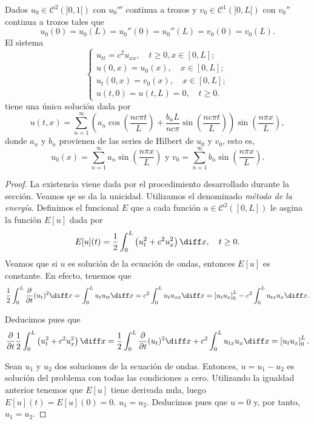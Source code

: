 \documentclass{article}
\begin{document}
\begin{theorem}
  \label{thm:ondas:2}
  Dados $u_0 \in \mathcal{C}^2(]0,1[)$ con $u_0'''$ continua a trozos y
  $v_0 \in \mathcal{C}^1(]0,L[)$ con $v_0''$ continua a trozos tales que
  \[ u_0(0) = u_0(L) = u_0''(0) = u_0''(L) = v_0(0) = v_0(L). \] El sistema
  \[
    \begin{cases}
      u_{tt} = c^2 u_{xx}, \quad t \ge 0, x \in [0,L]; \\
      u(0,x) = u_0(x), \quad x \in [0,L]; \\
      u_t(0,x) = v_0(x), \quad x \in [0,L]; \\
      u(t,0) = u(t, L) = 0, \quad t \ge 0.
    \end{cases}
  \]
  tiene una única solución dada por
  \[ u(t,x) = \sum\limits_{n = 1}^{\infty} \left( a_n \cos(\frac{n c \pi t}{L}) + \frac{b_nL}{n c
        \pi} \sin(\frac{n c \pi t}{L}) \right) \sin(\frac{n \pi x}{L}),\] donde $a_n$ y $b_n$
  provienen de las series de Hilbert de $u_0$ y $v_0$, esto es,
  \[u_0(x) = \sum\limits_{n = 1}^{\infty} a_n \sin(\frac{n \pi x}{L}) \text{ y } v_0 =
    \sum\limits_{n = 1}^{\infty} b_n \sin(\frac{n \pi x}{L}).\]
\end{theorem}
\begin{proof}
  La existencia viene dada por el procedimiento desarrollado durante la sección. Veamos qe se da la
  unicidad. Utilizamos el denominado \emph{método de la energía}. Definimos el funcional $E$ que a
  cada función $u \in \mathcal{C}^2([0,L])$ le asgina la función $E[u]$ dada por
  \[ E[u](t) = \frac{1}{2} \int_0^L \left( u_t^2 + c^2 u_x^2 \right) \diff x, \quad t \ge 0. \]
  Veamos que si $u$ es solución de la ecuación de ondas, entonces $E[u]$ es constante. En efecto,
  tenemos que
  \[ \frac{1}{2}\int_0^L \frac{\partial}{\partial t}(u_t)^2 \diff x = \int_0^L u_t u_{tt} \diff x =
    c^2\int_0^L u_t u_{xx} \diff x = \left[ u_t u_{x} \right]_0^L - c^2\int_0^L u_{tx} u_{x} \diff
    x. \]

  Deducimos pues que
  \[ \frac{\partial}{\partial t} \frac{1}{2} \int_0^L \left( u_t^2 + c^2 u_x^2 \right) \diff x =
    \frac{1}{2}\int_0^L \frac{\partial}{\partial t}(u_t)^2 \diff x + c^2\int_0^L u_{tx} u_{x} \diff
    x = \left[ u_t u_{x} \right]_0^L. \]
  
  
  Sean $u_1$ y $u_2$ dos soluciones de la ecuación de ondas. Entonces, $u = u_1 - u_2$ es solución
  del problema con todas las condiciones a cero. Utilizando la igualdad anterior tenemos que $E[u]$
  tiene derivada nula, luego $E[u](t) = E[u](0) = 0$.  $u_1 = u_2$. Deducimos pues que $u = 0$ y,
  por tanto, $u_1 = u_2$.
\end{proof}
\end{document}
